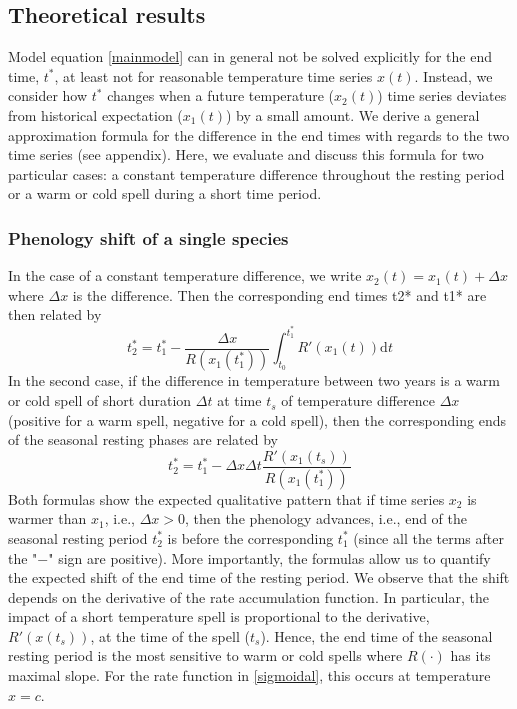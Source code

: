 \documentclass[12 pt]{article}
\begin{document}
\subsection{Theoretical results}
Model equation \ref{mainmodel} can in general not be solved explicitly for the end time, $t^*$, at least not for reasonable temperature time series $x(t)$. Instead, we consider how $t^*$ changes when a future temperature ($x_2(t)$) time series deviates from historical expectation ($x_1(t)$) by a small amount. We derive a general  approximation formula for the difference in the end times with regards to the two time series (see appendix). Here, we evaluate and discuss this formula for two particular cases: a constant temperature difference throughout the resting period or a warm or cold spell during a short time period. \par 

\subsubsection{Phenology shift of a single species}
In the case of a constant temperature difference, we write $x_2(t) = x_1(t)+\Delta x$ where $\Delta x$ is the difference. Then the corresponding end times t2* and t1* are then related by
\begin{equation}\label{constant}
    t_2 ^* = t_1 ^* - \frac{\Delta x}{R(x_1(t_1 ^*))} \int _{t_0} ^{t_1 ^*} R'(x_1(t)) \mathrm{d}t \tag{Eq. \theequation}
\end{equation}
In the second case, if the difference in temperature between two years is a warm or cold spell of short duration $\Delta t$ at time $t_s$ of temperature difference $\Delta x$ (positive for a warm spell, negative for a cold spell), then the corresponding ends of the seasonal resting phases are related by
\begin{equation}\label{spell}
    t_2 ^* = t_1 ^* - \Delta x \Delta t \frac{R'(x_1 (t_s))}{R(x_1(t_1 ^*))} \tag{Eq. \theequation}
\end{equation}
Both formulas show the expected qualitative pattern that if time series $x_2$ is warmer than $x_1$, i.e., $\Delta x >0$, then the phenology advances, i.e., end of the seasonal resting period $t_2 ^*$ is before the corresponding $t_1 ^*$ (since all the terms after the "$-$" sign are positive). More importantly, the formulas allow us to quantify the expected shift of the end time of the resting period. We observe that the shift depends on the derivative of the rate accumulation function. In particular, the impact of a short temperature spell is proportional to the derivative, $R'(x(t_s))$, at the time of the spell ($t_s$). Hence, the end time of the seasonal resting period is the most sensitive to warm or cold spells where $R(\cdot)$ has its maximal slope. For the rate function in \ref{sigmoidal}, this occurs at temperature $x=c$.
\end{document}

